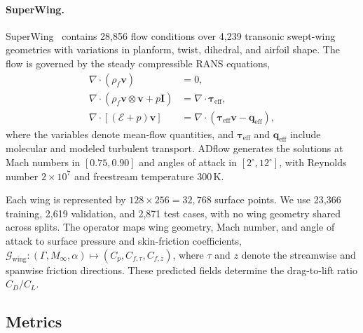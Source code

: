 \paragraph{SuperWing.}
SuperWing~\citep{yang2025superwing} contains 28,856 flow conditions over 4,239 transonic swept-wing geometries with variations in planform, twist, dihedral, and airfoil shape. The flow is governed by the steady compressible RANS equations,
\begin{equation}
    \begin{aligned}
        \nabla\!\cdot(\rho_f\mathbf{v})&=0,\\
        \nabla\!\cdot(\rho_f\mathbf{v}\otimes\mathbf{v}+p\mathbf{I})
        &=\nabla\!\cdot\boldsymbol{\tau}_{\mathrm{eff}},\\
        \nabla\!\cdot[(\mathcal{E}+p)\mathbf{v}]
        &=\nabla\!\cdot(\boldsymbol{\tau}_{\mathrm{eff}}\mathbf{v}-\mathbf{q}_{\mathrm{eff}}),
    \end{aligned}
    \label{eq:app_superwing}
\end{equation}
where the variables denote mean-flow quantities, and $\boldsymbol{\tau}_{\mathrm{eff}}$ and $\mathbf{q}_{\mathrm{eff}}$ include molecular and modeled turbulent transport. ADflow generates the solutions at Mach numbers in $[0.75,0.90]$ and angles of attack in $[2^{\circ},12^{\circ}]$, with Reynolds number $2\times10^7$ and freestream temperature $300\,\mathrm{K}$.

Each wing is represented by $128\times256=32{,}768$ surface points. We use 23,366 training, 2,619 validation, and 2,871 test cases, with no wing geometry shared across splits. The operator maps wing geometry, Mach number, and angle of attack to surface pressure and skin-friction coefficients, $\mathcal{G}_{\mathrm{wing}}:(\Gamma,M_\infty,\alpha)\mapsto(C_p,C_{f,\tau},C_{f,z})$, where $\tau$ and $z$ denote the streamwise and spanwise friction directions. These predicted fields determine the drag-to-lift ratio $C_D/C_L$.

\subsection{Metrics}
\label{app:metrics}

